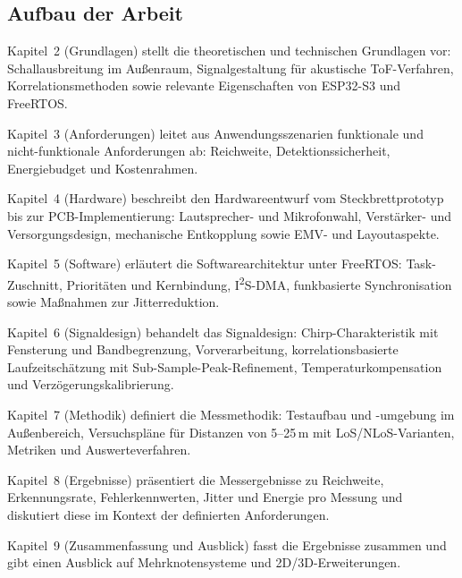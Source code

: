 \subsection{Aufbau der Arbeit}


Kapitel~2 (Grundlagen) stellt die theoretischen und technischen Grundlagen vor: Schallausbreitung im Außenraum, Signalgestaltung für akustische ToF-Verfahren, Korrelationsmethoden sowie relevante Eigenschaften von ESP32-S3 und FreeRTOS.

Kapitel~3 (Anforderungen) leitet aus Anwendungsszenarien funktionale und nicht-funktionale Anforderungen ab: Reichweite, Detektionssicherheit, Energiebudget und Kostenrahmen.

Kapitel~4 (Hardware) beschreibt den Hardwareentwurf vom Steckbrettprototyp bis zur PCB-Implementierung: Lautsprecher- und Mikrofonwahl, Verstärker- und Versorgungsdesign, mechanische Entkopplung sowie EMV- und Layoutaspekte.

Kapitel~5 (Software) erläutert die Softwarearchitektur unter FreeRTOS: Task-Zuschnitt, Prioritäten und Kernbindung, I\textsuperscript{2}S-DMA, funkbasierte Synchronisation sowie Maßnahmen zur Jitterreduktion.

Kapitel~6 (Signaldesign) behandelt das Signaldesign: Chirp-Charakteristik mit Fensterung und Bandbegrenzung, Vorverarbeitung, korrelationsbasierte Laufzeitschätzung mit Sub-Sample-Peak-Refinement, Temperaturkompensation und Verzögerungskalibrierung.

Kapitel~7 (Methodik) definiert die Messmethodik: Testaufbau und -umgebung im Außenbereich, Versuchspläne für Distanzen von 5--25\,m mit LoS/NLoS-Varianten, Metriken und Auswerteverfahren.

Kapitel~8 (Ergebnisse) präsentiert die Messergebnisse zu Reichweite, Erkennungsrate, Fehlerkennwerten, Jitter und Energie pro Messung und diskutiert diese im Kontext der definierten Anforderungen.

Kapitel~9 (Zusammenfassung und Ausblick) fasst die Ergebnisse zusammen und gibt einen Ausblick auf Mehrknotensysteme und 2D/3D-Erweiterungen.
